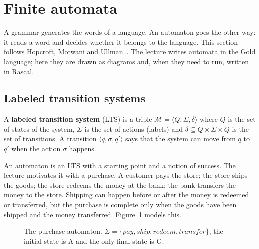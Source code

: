 \section{Finite automata}
\label{sec:automata}

A grammar generates the words of a language. An automaton goes the other way:
it reads a word and decides whether it belongs to the language. This section
follows Hopcroft, Motwani and Ullman~\cite[Ch.~2]{hopcroft2007automata}. The
lecture writes automata in the Gold language; here they are drawn as diagrams
and, when they need to run, written in Rascal.

\subsection{Labeled transition systems}

\begin{definition}
A \textbf{labeled transition system} (LTS) is a triple $\mathcal{M} = \langle Q,
\Sigma, \delta \rangle$ where $Q$ is the set of states of the system, $\Sigma$ is
the set of actions (labels) and $\delta \subseteq Q \times \Sigma \times Q$ is the
set of transitions. A transition $\langle q, \sigma, q' \rangle$ says that the
system can move from $q$ to $q'$ when the action $\sigma$ happens.
\end{definition}

An automaton is an LTS with a starting point and a notion of success. The
lecture motivates it with a purchase. A customer pays the store; the store
ships the goods; the store redeems the money at the bank; the bank transfers
the money to the store. Shipping can happen before or after the money is
redeemed or transferred, but the purchase is complete only when the goods
have been shipped and the money transferred. Figure~\ref{fig:shopping} models
this.

\begin{figure}[h]
\centering
{}
\caption{The purchase automaton. $\Sigma = \{\mathit{pay}, \mathit{ship},
\mathit{redeem}, \mathit{transfer}\}$, the initial state is A and the only
final state is G.}
\label{fig:shopping}
\end{figure}

